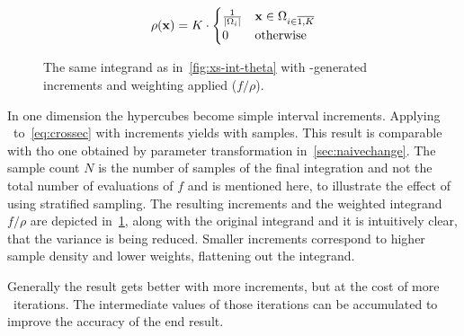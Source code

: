 \begin{equation}
  \label{eq:vegasrho}
  \rho(\vb{x}) = K\cdot
  \begin{cases}
    \frac{1}{\abs{\Omega_i}} & \vb{x}\in\Omega_{i\in\overline{1,K}} \\
    0 & \text{otherwise}
  \end{cases}
\end{equation}

\begin{figure}[ht]
  \centering {}
  \caption[\(2\pi\dv{\sigma}{\theta}\) scaled to increments found by
  \vegas\ ]{\label{fig:xs-int-vegas} The same integrand as
    in~\ref{fig:xs-int-theta} with \vegas-generated increments and
    weighting applied (\(f/\rho\)).}
\end{figure}

In one dimension the hypercubes become simple interval
increments. Applying \vegas\ to~\eqref{eq:crossec} with
 increments yields
 with
 samples. This result is comparable
with tho one obtained by parameter transformation
in~\ref{sec:naivechange}.  The sample count \(N\) is the number of
samples of the final integration and not the total number of
evaluations of \(f\) and is mentioned here, to illustrate the effect
of using stratified sampling. The resulting increments and the
weighted integrand \(f/\rho\) are depicted in~\ref{fig:xs-int-vegas},
along with the original integrand and it is intuitively clear, that
the variance is being reduced. Smaller increments correspond to higher
sample density and lower weights, flattening out the integrand.

Generally the result gets better with more increments, but at the cost
of more \vegas\ iterations. The intermediate values of those
iterations can be accumulated to improve the accuracy of the end
result.~\cite[197]{Lepage:19781an}
